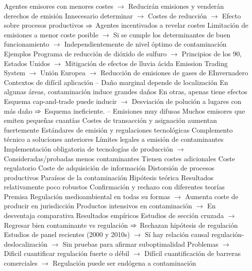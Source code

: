 \documentclass{nuevotema}
\begin{document}
\begin{esquemal}
				\4[] Agentes emisores con menores costes
				\4[] $\to$ Reducirán emisiones y venderán derechos de emisión
				\4[] Innecesario determinar
				\4[] $\to$ Costes de reducción
				\4[] $\to$ Efecto sobre procesos productivos
				\4[] $\Rightarrow$ Agentes incentivados a revelar costes
				\4[] Limitación de emisiones a menor coste posible
				\4[] $\to$ Si se cumple los determinantes de buen funcionamiento
				\4[] $\to$ Independientemente de nivel óptimo de contaminación
				\4 Ejemplos
				\4[] Programa de reducción de dióxido de sulfuro
				\4[] $\to$ Principios de los 90, Estados Unidos
				\4[] $\to$ Mitigación de efectos de lluvia ácida
				\4[] Emission Trading System
				\4[] $\to$ Unión Europea
				\4[] $\to$ Reducción de emisiones de gases de EInvernadero
				\4 Contextos de difícil aplicación
				\4[] -- Daño marginal depende de localización
				\4[] En algunas áreas, contaminación induce grandes daños
				\4[] En otras, apenas tiene efectos
				\4[] Esquema cap-and-trade puede inducir
				\4[] $\to$ Desviación de polución a lugares con más daño
				\4[] $\Rightarrow$ Esquema ineficiente.
				\4[] -- Emisiones muy difusas
				\4[] Muchos emisores que emiten pequeñas cuantías
				\4[] Costes de transacción y asignación aumentan fuertemente
			\3 Estándares de emisión y regulaciones tecnológicas
				\4 Complemento técnico a soluciones anteriores
				\4 Límites legales a emisión de contaminantes
				\4 Implementación obligatoria de tecnologías de producción
				\4[] $\to$ Consideradas/probadas menos contaminantes
				\4 Tienen costes adicionales
				\4[] Coste regulatorio
				\4[] Coste de adquisición de información
				\4[] Distorsión de procesos productivos
			\3 Paraísos de la contaminación
				\4 Hipótesis teórica
				\4[] Resultados relativamente poco robustos
				\4[] Confirmación y rechazo con diferentes teorías
				\4 Premisa
				\4[] Regulación medioambiental en todas su formas
				\4[] $\to$ Aumenta coste de producir en jurisdicción
				\4[] Productos intensivos en contaminación
				\4[] $\to$ En desventaja comparativa
				\4 Resultados empíricos
				\4[] Estudios de sección cruzada
				\4[] $\to$ Regresar bien contaminante vs regulación
				\4[] $\Rightarrow$ Rechazan hipótesis de regulación
				\4[] Estudios de panel recientes (2000 y 2010s)
				\4[] $\to$ Sí hay relación causal regulación-deslocalización
				\4[] $\to$ Sin pruebas para afirmar suboptimalidad
				\4[] Problemas
				\4[] $\to$ Dificil cuantificar regulación fuerte o débil
				\4[] $\to$ Difícil cuantificación de barreras comerciales
				\4[] $\to$ Regulación puede ser endógena a contaminación

\end{esquemal}
\end{document}

